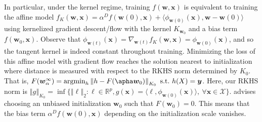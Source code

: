 \documentclass{article}
\begin{document}
In particular, under the kernel regime, training $f(\boldsymbol{w}, \boldsymbol{x})$ is equivalent to training the affine model $f_K(\boldsymbol{w}, \boldsymbol{x}) = \alpha^Df(\boldsymbol{w}(0), \boldsymbol{x}) + \langle \phi_{\boldsymbol{w}(0)}(\boldsymbol{x}), \boldsymbol{w} - \boldsymbol{w}(0) \rangle$ using kernelized gradient descent/flow with the kernel $K_{\boldsymbol{w}_0}$ and a bias term $f(\boldsymbol{w}_0, \boldsymbol{x})$. Observe that $\phi_{\boldsymbol{w}(t)}(\boldsymbol{x}) = \nabla_{\boldsymbol{w}(t)} f_K(\boldsymbol{w}, \boldsymbol{x}) = \phi_{\boldsymbol{w}(0)}(\boldsymbol{x})$, and so the tangent kernel is indeed constant throughout training. Minimizing the loss of this affine model with gradient flow reaches the solution nearest to initialization where distance is measured with respect to the RKHS norm determined by $K_0$. That is, $F(\boldsymbol{w}_{\alpha}^{\infty}) = \text{argmin}_h \left\Vert h - F(\apha \boldsymbol{w}_0) \right\Vert_{K_0} \ \text{s.t.} \ h(X) = \boldsymbol{y}$. Here, our RKHS norm is $\left\Vert g \right\Vert_{K_0} = \inf \{ \left\Vert \ell \right\Vert_2: \ell \in \mathbb{R}^p, g(\boldsymbol{x}) = \langle \ell, \phi_{\boldsymbol{w}(0)}(\boldsymbol{x}) \rangle, \ \forall \boldsymbol{x} \in \mathcal{X}\}$. \cite{chizat2018lazy} advises choosing an unbiased initialization $\boldsymbol{w}_0$ such that $F(\boldsymbol{w}_0) = 0$. This means that the bias term $\alpha^Df(\boldsymbol{w}(0), \boldsymbol{x})$ depending on the initialization scale vanishes. 
\end{document}

